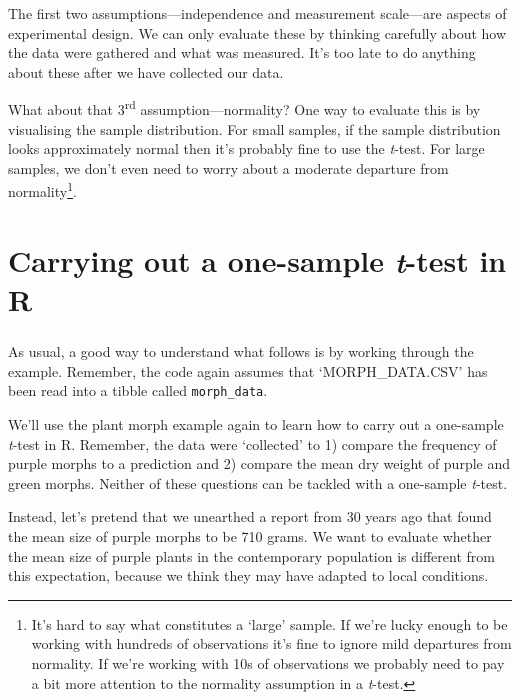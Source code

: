 \documentclass[
]{book}
\newenvironment{greybox}{
  \definecolor{shadecolor}{rgb}{0.95,0.95,0.95}  %
  \color{black}
  \begin{shaded}}
 {\end{shaded}}
\newenvironment{infobox}[1]
  {
  \begin{itemize}
  \renewcommand{\labelitemi}{
    \raisebox{-.7\height}[0pt][0pt]{
      {\setkeys{Gin}{width=3em,keepaspectratio}
        \texttt{[image: images/\#1]}}
    }
  }
  \setlength{\fboxsep}{1em}
  \begin{greybox}
  \item
  }
  {
  \end{greybox}
  \end{itemize}
  }
\begin{document}
The first two assumptions---independence and measurement scale---are aspects of experimental design. We can only evaluate these by thinking carefully about how the data were gathered and what was measured. It's too late to do anything about these after we have collected our data.

What about that 3\textsuperscript{rd} assumption---normality? One way to evaluate this is by visualising the sample distribution. For small samples, if the sample distribution looks approximately normal then it's probably fine to use the \emph{t}-test. For large samples, we don't even need to worry about a moderate departure from normality\footnote{It's hard to say what constitutes a `large' sample. If we're lucky enough to be working with hundreds of observations it's fine to ignore mild departures from normality. If we're working with 10s of observations we probably need to pay a bit more attention to the normality assumption in a \emph{t}-test.}.

\hypertarget{carrying-out-a-one-sample-t-test-in-r}{%
\section{\texorpdfstring{Carrying out a one-sample \emph{t}-test in R}{Carrying out a one-sample t-test in R}}\label{carrying-out-a-one-sample-t-test-in-r}}

\begin{infobox}{action}

\hypertarget{section-3}{%
\subsubsection*{}\label{section-3}}

As usual, a good way to understand what follows is by working through the example. Remember, the code again assumes that `MORPH\_DATA.CSV' has been read into a tibble called \texttt{morph\_data}.

\end{infobox}

We'll use the plant morph example again to learn how to carry out a one-sample \emph{t}-test in R. Remember, the data were `collected' to 1) compare the frequency of purple morphs to a prediction and 2) compare the mean dry weight of purple and green morphs. Neither of these questions can be tackled with a one-sample \emph{t}-test.

Instead, let's pretend that we unearthed a report from 30 years ago that found the mean size of purple morphs to be 710 grams. We want to evaluate whether the mean size of purple plants in the contemporary population is different from this expectation, because we think they may have adapted to local conditions.
\end{document}

